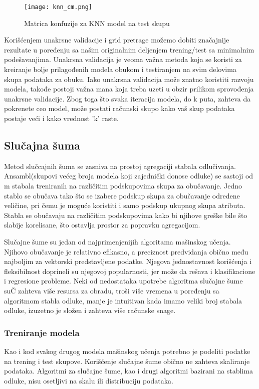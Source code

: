 \documentclass[a4paper,12pt]{article}
\begin{document}
\begin{figure}[h!]
\centering
\texttt{[image: knn\_cm.png]}
\caption{Matrica konfuzije za KNN model na test skupu}
\label{fig:knn_cm}
\end{figure}

Korišćenjem unakrsne validacije i grid pretrage možemo dobiti značajnije rezultate u poređenju sa našim originalnim deljenjem trening/test sa minimalnim podešavanjima. Unakrsna validacija je veoma važna metoda koja se koristi za kreiranje bolje prilagođenih modela obukom i testiranjem na svim delovima skupa podataka za obuku.
Iako unakrsna validacija može znatno koristiti razvoju modela, takođe postoji važna mana koja treba uzeti u obzir prilikom sprovođenja unakrsne validacije. Zbog toga što svaka iteracija modela, do k puta, zahteva da pokrenete ceo model, može postati računski skupo kako vaš skup podataka postaje veći i kako vrednost 'k' raste.

\subsection{Slučajna šuma}
Metod slučcajnih šuma se zasniva na prostoj agregaciji stabala odlučivanja.
Ansambl(skupovi većeg broja modela koji zajednički donose odluke) se sastoji od m stabala treniranih na različitim podskupovima skupa
za obučavanje. Jedno stablo se obučava tako što se izabere podskup skupa
za obučavanje odredene veličine, pri čemu je moguće koristiti i samo podskup
ukupnog skupa atributa. Stabla se obučavaju na različitim podskupovima kako
bi njihove greške bile što slabije korelisane, što ostavlja prostor za popravku
agregacijom.

Slučajne šume su jedan od najprimenjenijih algoritama mašinskog učenja.
Njihovo obučavanje je relativno efikasno, a preciznost predvidanja obično među
najboljim za vektorski predstavljene podatke. Njegova jednostavnost korišćenja i fleksibilnost doprineli su njegovoj popularnosti, jer može da rešava i klasifikacione i regresione probleme. Neki od nedostataka upotrebe algoritma slučajne šume suČ zahteva više resursa za obradu, troši više vremena u poređenju sa algoritmom stabla odluke, manje je intuitivan kada imamo veliki broj stabala odluke, izuzetno je složen i zahteva više računske snage.

\subsubsection{Treniranje modela}
Kao i kod svakog drugog modela mašinskog učenja potrebno je podeliti podatke na
trening i test skupove. Korišćenje slučajne šume obično ne zahteva skaliranje podataka. Algoritmi za slučajne šume, kao i drugi algoritmi bazirani na stablima odluke, nisu osetljivi na skalu ili distribuciju podataka.
\end{document}
